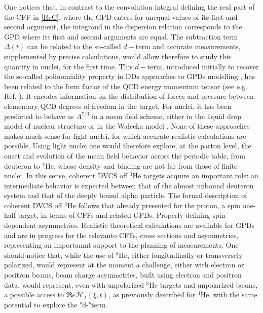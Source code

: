 \documentclass[times, twoside]{PosWhiPap}
\begin{document}
One notices that, in contrast to the convolution integral defining the real 
part of the CFF in \eqref{ReC}, where the GPD enters for unequal values of its 
first and second argument, the integrand in the dispersion relation
corresponds to the GPD where its first and second arguments are equal.
The subtraction term $\Delta(t)$ can be related to the so-called $d-$term and
accurate measurements, supplemented by precise calculations, would allow therefore to study
this quantity in nuclei, for the first time.
This $d-$term, introduced initially to recover 
the so-called polinomiality property in DDs approaches to GPDs modelling \cite{Polyakov:1999gs},
has been related to the form factor of the QCD energy momentum tensor (see e.g. Ref.  
\cite{Polyakov:2018zvc}). It encodes information on the distribution of forces 
and pressure between elementary QCD degrees of freedom in the target. For
nuclei, it has been predicted to behave as $A^{7/3}$ in a mean field scheme, 
either in the liquid drop model of nuclear structure \cite{Polyakov:2002yz}
or in the Walecka model \cite{Jung:2014jja}. None of these approaches makes 
much sense for light nuclei, for which accurate realistic calculations are possible. 
Using light nuclei one would therefore explore, at the parton 
level, the onset and evolution of the mean field behavior across the
periodic 
table, from deuteron to $^4$He, whose density and binding are not far
from those of finite nuclei.
\vskip 0.2cm
In this sense, coherent DVCS off $^3$He targets acquire an important role: an intermediate 
behavior is expected between that of the almost unbound deuteron system and 
that of the deeply bound alpha particle. The formal description of coherent DVCS
off $^3$He follows that already presented for the proton, a spin one-half target, in terms of CFFs
and related GPDs. Properly
defining spin dependent asymmetries. Realistic theoretical calculations
are available for GPDs 
\cite{Scopetta:2004kj,Scopetta:2009sn,Rinaldi:2012ft,Rinaldi:2012pj} and are in 
progress for the relevanto CFFs, cross sections and asymmetries, representing
an importanmt support to the planning of measurements.
{One should notice that, while the use of $^3$He, either longitudinally or transversely polarized,
would represent at the moment a challenge, either with electron or positron beams, 
beam charge asymmetries, built using
electron and positron data, would represent, even with unpolarized $^3$He targets and unpolarized beams, a possible access to
$\Re e \mathcal{H}_{A} (\xi,t)$,
as previously described for $^4$He, with the same potential to explore the "d-"term.}
\end{document}
